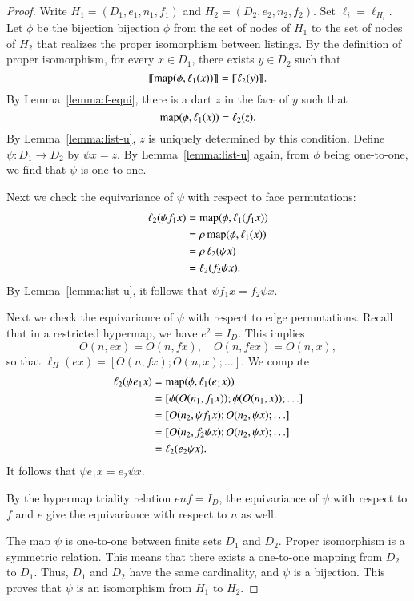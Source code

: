 \begin{proof} 
  Write $H_1 =(D_1,e_1,n_1,f_1)$ and $H_2=(D_2,e_2,n_2,f_2)$.  Set
  $\ell_i = \ell_{H_i}$.  Let $\phi$ be the bijection bijection $\phi$
  from the set of nodes of $H_1$ to the set of nodes of $H_2$ that
  realizes the proper isomorphism between listings.  By the definition
  of proper isomorphism, for every $x\in D_1$, there exists $y\in D_2$
  such that
\[
{\llbracket{{\operatorname{map}}(\phi,\ell_{1}(x))}\rrbracket} = {\llbracket{\ell_{2}(y)}\rrbracket}.
\]
By Lemma~\ref{lemma:f-equi}, there is a dart $z$ in the face of $y$ such that
\[
{\operatorname{map}}(\phi,\ell_{1}(x)) = \ell_{2}(z).
\]
By Lemma~\ref{lemma:list-u}, $z$ is uniquely determined by this
condition.  Define $\psi:D_1\to D_2$ by $\psi x = z$.  By
Lemma~\ref{lemma:list-u} again, from $\phi$ being one-to-one, we find
that $\psi$ is one-to-one.

Next we check the equivariance of $\psi$ with respect to face permutations:
\begin{align*}
\ell_{2}(\psi f_1 x) &= {\operatorname{map}}(\phi,\ell_{1}(f_1 x)) \\
   &= \rho\, {\operatorname{map}}(\phi,\ell_{1} (x)) \\
   &= \rho\, \ell_{2}(\psi x)\\
   &= \ell_2(f_2 \psi x).
\end{align*}
By Lemma~\ref{lemma:list-u}, it follows that $\psi f_1 x = f_2 \psi x$.

Next we check the equivariance of $\psi$ with respect to edge
permutations.  Recall that in a restricted hypermap, we have
$e^2=I_D$.  This implies
\[
O(n,e x) =  O(n,f x),\quad
O(n,f e x) = O(n,x),
\]
so that $\ell_H(e x) = [O(n,f x);O(n,x);\ldots]$.  We compute
\begin{align*}
\ell_2(\psi e_1 x) &= {\operatorname{map}}(\phi,\ell_1(e_1 x)) \\
  &= [\phi(O(n_1,f_1 x));\phi(O(n_1,x));\ldots]\\
  &= [O(n_2,\psi f_1 x);O(n_2,\psi x);\ldots]\\
  &= [O(n_2,f_2\psi x);O(n_2,\psi x);\ldots]\\
   &=\ell_2(e_2 \psi x).
\end{align*}
It follows that $\psi e_1 x = e_2 \psi x$.

By the hypermap triality relation $e n f = I_D$, the equivariance of
$\psi$ with respect to $f$ and $e$ give the equivariance with respect
to $n$ as well.

The map $\psi$ is one-to-one between finite sets $D_1$ and $D_2$.
Proper isomorphism is a symmetric relation.  This means that there
exists a one-to-one mapping from $D_2$ to $D_1$.  Thus, $D_1$ and
$D_2$ have the same cardinality, and $\psi$ is a bijection.  This
proves that $\psi$ is an isomorphism from $H_1$ to $H_2$.
\end{proof}

